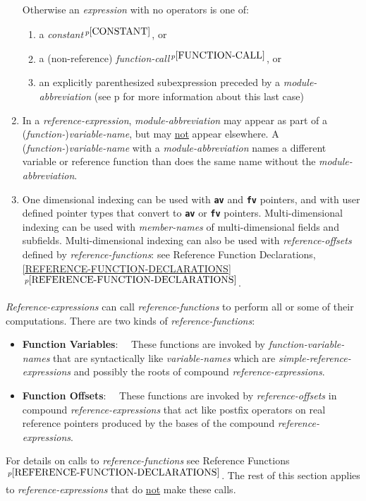\documentclass[12pt]{article}
\newcommand{\TT}[1]{{\tt \bfseries #1}}
\newcommand{\key}[1]{{\rm \bfseries #1}}
\newcommand{\itemref}[1]{\ref{#1}$\,^{p\pageref{#1}}$}
\newcommand{\pagref}[1]{p\pageref{#1}}
\newcommand{\pagnote}[1]{$\,^{p\pageref{#1}}$}
\newenvironment{indpar}[1][0.3in]%
	{\begin{list}{}%
		     {\setlength{\itemsep}{0in}%
		      \setlength{\topsep}{0in}%
		      \setlength{\parsep}{1ex}%
		      \setlength{\labelwidth}{#1}%
		      \setlength{\leftmargin}{#1}%
		      \addtolength{\leftmargin}{\labelsep}}%
	 \item}%
	{\end{list}}
\begin{document}
\begin{indpar}
\begin{enumerate}
Otherwise an {\em expression} with no operators is one of:
\begin{enumerate}
\item a {\em constant}\pagnote{CONSTANT}, or
\item
a (non-reference) {\em function-call}\pagnote{FUNCTION-CALL}, or
\item
an explicitly parenthesized subexpression
preceded by a {\em module-abbreviation}
(see \pagref{MA-SYNTACTIC-SUGAR} for more information about this last case)
\end{enumerate}
\item In a {\em reference-expression},
{\em module-abbreviation} may appear as part of a
({\em function-}){\em variable-name}, but may \underline{not} appear
elsewhere.
A ({\em function-}){\em variable-name} with a {\em module-abbreviation}
names a different variable or reference function than does the same
name without the {\em module-abbreviation}.
\item
One dimensional indexing can be used with \TT{av} and \TT{fv} pointers,
and with user defined pointer types that convert to \TT{av} or \TT{fv}
pointers.
Multi-dimensional indexing can be used with {\em member-names}
of multi-dimensional fields and subfields.  Multi-dimensional indexing
can also be used with {\em reference-offsets} defined by
{\em reference-functions}: see Reference Function Declarations,
\itemref{REFERENCE-FUNCTION-DECLARATIONS}.

\end{enumerate}
\end{indpar}

{\em Reference-expressions} can call {\em reference-functions} to perform
all or some of their computations.  There are two kinds of
{\em reference-functions}:
\begin{itemize}
\item\key{Function Variables}:~~
These functions
are invoked by {\em function-variable-names} that are syntactically
like {\em variable-names} which are {\em simple-reference-expressions} and
possibly the roots of compound {\em reference-expressions}.
\item\key{Function Offsets}:~~
These functions are invoked by {\em reference-offsets} in
compound {\em reference-expressions}
that act like postfix operators on
real reference pointers produced by the bases of the
compound {\em reference-expressions}.
\end{itemize}

For details on calls to {\em reference-functions}
see Reference Functions\pagnote{REFERENCE-FUNCTION-DECLARATIONS}.
The rest of this section applies to {\em reference-expressions}
that do \underline{not} make these calls.
\end{document}
